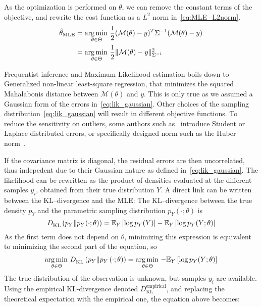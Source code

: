 \documentclass[../../Main_ManuscritThese.tex]{subfiles}
\begin{document}
As the optimization is performed on $\theta$, we can remove the constant terms of the objective, and rewrite the cost function as a $L^2$ norm in~\cref{eq:MLE_L2norm}.  %
  \begin{align}
    \hat{\theta}_{\mathrm{MLE}} &= \operatorname*{arg\,min \,}_{\theta \in \Theta}\frac{1}{2}(\mathcal{M}(\theta) - y)^T\Sigma^{-1}(\mathcal{M}(\theta) - y) \nonumber\\
                           &= \operatorname*{arg\,min \,}_{\theta \in \Theta}\frac12 \| \mathcal{M}(\theta) - y \|^2_{\Sigma^{-1}} \label{eq:MLE_L2norm}
  \end{align}

  Frequentist inference and Maximum Likelihood estimation boils down to Generalized non-linear least-square regression, that minimizes the squared Mahalabonis distance between $\mathcal{M}({\theta})$ and $y$. This is only true as we assumed a Gaussian form of the errors in~\cref{eq:lik_gaussian}. Other choices of the sampling distribution~\cref{eq:lik_gaussian} will result in different objective functions. To reduce the sensitivity on outliers, some authors such as~\cite{rao_robust_2015} introduce Student or Laplace distributed errors, or specifically designed norm such as the Huber norm~\cite{huber_robust_2011}.

  If the covariance matrix is diagonal, the residual errors are then uncorrelated, thus indepedent due to their Gaussian nature as defined in~\cref{eq:lik_gaussian}. The likelihood can be rewritten as the product of densities evaluated at the different samples $y_i$, obtained from their true distribution $Y$.
  A direct link can be written between the KL--divergence and the MLE:
  The KL--divergence between the true density $p_Y$ and the parametric sampling distribution $p_Y(\cdot;\theta)$ is
  \begin{equation}
  D^{\mathrm{}}_{\mathrm{KL}}\left(p_Y \| p_Y(\cdot;\theta)\right) = \mathbb{E}_Y\left[\log p_Y(Y)\right]-\mathbb{E}_Y\left[\log p_Y(Y;\theta)\right]  
\end{equation}
As the first term does not depend on $\theta$, minimizing this expression is equivalent to minimizing the second part of the equation, so
\begin{align}
 \operatorname*{arg\,min \,}_{\theta \in\Theta} D^{\mathrm{}}_{\mathrm{KL}}\left(p_Y \| p_Y\left(\cdot;\theta \right)\right) = \operatorname*{arg\,min \,}_{\theta \in \Theta} -\mathbb{E}_{Y}\left[\log p_{Y}(Y ; \theta)\right]
\end{align}
The true distribution of the observation is unknown, but samples $y_i$ are available. Using the empirical KL-divergence denoted $D^{\mathrm{empirical}}_{\mathrm{KL}}$,  and replacing the theoretical expectation with the empirical one, the equation above becomes:
\end{document}
